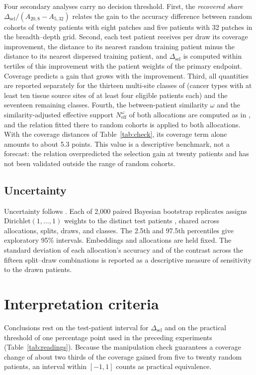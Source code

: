 \documentclass[11pt]{article}
\newcommand{\Neff}{N_{\mathrm{eff}}}
\begin{document}
Four secondary analyses carry no decision threshold. First, the \emph{recovered share} $\Delta_{\mathrm{sel}}/(A_{20,8}-A_{5,32})$ relates the gain to the accuracy difference between random cohorts of twenty patients with eight patches and five patients with 32 patches in the breadth--depth grid. Second, each test patient receives per draw its coverage improvement, the distance to its nearest random training patient minus the distance to its nearest dispersed training patient, and $\Delta_{\mathrm{sel}}$ is computed within tertiles of this improvement with the patient weights of the primary endpoint. Coverage predicts a gain that grows with the improvement. Third, all quantities are reported separately for the thirteen multi-site classes of \citet{queisler2026siteCoverage} (cancer types with at least ten tissue source sites of at least four eligible patients each) and the seventeen remaining classes. Fourth, the between-patient similarity $\omega$ and the similarity-adjusted effective support $\Neff^{\omega}$ of both allocations are computed as in \citet{queisler2026coverageRedundancy}, and the relation fitted there to random cohorts is applied to both allocations. With the coverage distances of Table~\ref{tab:check}, its coverage term alone amounts to about 5.3 points. This value is a descriptive benchmark, not a forecast: the relation overpredicted the selection gain at twenty patients and has not been validated outside the range of random cohorts.

\subsection{Uncertainty}
\label{sec:uncertainty}
Uncertainty follows \citet{queisler2026effectiveSupport}. Each of 2,000 paired Bayesian bootstrap replicates assigns $\mathrm{Dirichlet}(1,\ldots,1)$ weights to the distinct test patients \citep{rubin1981bayesian}, shared across allocations, splits, draws, and classes. The 2.5th and 97.5th percentiles give exploratory 95\% intervals. Embeddings and allocations are held fixed. The standard deviation of each allocation's accuracy and of the contrast across the fifteen split--draw combinations is reported as a descriptive measure of sensitivity to the drawn patients.

\section{Interpretation criteria}
\label{sec:interpretation}
Conclusions rest on the test-patient interval for $\Delta_{\mathrm{sel}}$ and on the practical threshold of one percentage point used in the preceding experiments (Table~\ref{tab:readings}). Because the manipulation check guarantees a coverage change of about two thirds of the coverage gained from five to twenty random patients, an interval within $[-1,1]$ counts as practical equivalence.
\end{document}
